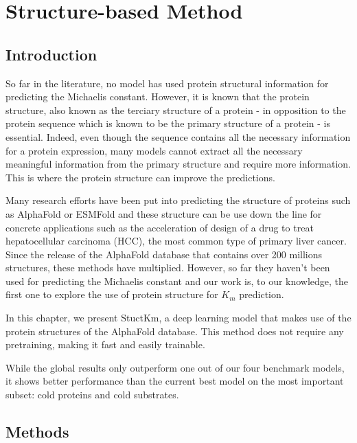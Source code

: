 
\chapter{Structure-based Method}
\label{chap:4}

\section{Introduction}

So far in the literature, no model has used protein structural information for predicting the Michaelis
constant. However, it is known that the protein structure, also known as the terciary structure of a protein - in
opposition to the protein sequence which is known to be the primary structure of a protein - is essential. \cite{lehninger} Indeed,
even though the sequence contains all the necessary information for a protein expression, many models cannot
extract all the necessary meaningful information from the primary structure and require more information. This is
where the protein structure can improve the predictions. 

Many research efforts have been put into predicting the structure of proteins such as AlphaFold or ESMFold and
these structure can be use down the line for concrete applications such as the acceleration of design 
of a drug to treat hepatocellular carcinoma (HCC), the most common type of primary liver cancer. \cite{Buel2022AlphaFold,Lin2023ProteinStructure,D2SC05709C}
Since the release of the AlphaFold database that contains over 200 millions structures, these methods have multiplied. \cite{Varadi2022AlphaFold}
However, so far they haven't been used for predicting the Michaelis constant and our work is, to our knowledge, 
the first one to explore the use of protein structure for $K_m$ prediction.

In this chapter, we present StuctKm, a deep learning model that makes use of the protein structures of the
AlphaFold database. This method does not require any pretraining, making it fast and easily trainable. 

While the global results only outperform one out of our four benchmark models, it shows better performance than the current best model on the most important subset: cold proteins and cold substrates.

\section{Methods}

